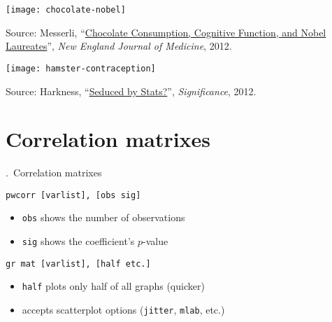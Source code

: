 \documentclass[t]{beamer}
\begin{document}
	
    \begin{frame}[c]

		\begin{center}
			\texttt{[image: chocolate-nobel]}
		\end{center}
		
		\vfill \par Source: Messerli, ``\href{http://www.nejm.org/doi/pdf/10.1056/NEJMon1211064}{Chocolate Consumption, Cognitive Function, and Nobel Laureates}'', \emph{New England Journal of Medicine}, 2012.
		
	\end{frame}

	
	\begin{frame}[c]

		\begin{center}
			\texttt{[image: hamster-contraception]}	
		\end{center}
		
		\vfill \par Source: Harkness, ``\href{http://onlinelibrary.wiley.com/doi/10.1111/j.1740-9713.2012.00549.x/abstract}{Seduced by Stats?}'', \emph{Significance}, 2012.
		
	\end{frame}

	
	\section{Correlation matrixes}

  \begin{frame}[c]{\thesection.~Correlation matrixes}
		
		\begin{block}{\texttt{pwcorr [varlist], [obs sig]}}

	        \begin{itemize}
	          \item \texttt{obs} shows the number of observations
			  \item \texttt{sig} shows the coefficient's $p$-value
	        \end{itemize}

		\end{block}

		\begin{block}{\texttt{gr mat [varlist], [half etc.]}}		

	        \begin{itemize}
	          \item \texttt{half} plots only half of all graphs (quicker)
			  		\item accepts scatterplot options (\texttt{jitter}, \texttt{mlab}, etc.)
	        \end{itemize}

		\end{block}
	
	\end{frame}
\end{document}
